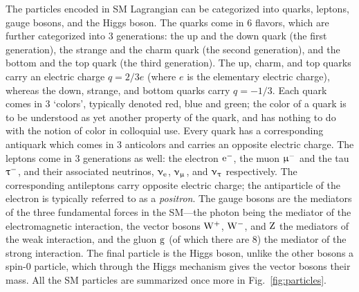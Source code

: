 The particles encoded in SM Lagrangian can be categorized into quarks, leptons, gauge bosons, and the Higgs boson.
% 
The quarks come in 6 flavors, which are further categorized into 3 generations: the up and the down quark (the first generation), the strange and the charm quark (the second generation), and the bottom and the top quark (the third generation).
% 
The up, charm, and top quarks carry an electric charge $q = 2/3e$ (where $e$ is the elementary electric charge), whereas the down, strange, and bottom quarks carry $q=-1/3$.
% 
Each quark comes in 3 `colors', typically denoted red, blue and green; the color of a quark is to be understood as yet another property of the quark, and has nothing to do with the notion of color in colloquial use.
% 
Every quark has a corresponding antiquark which comes in 3 anticolors and carries an opposite electric charge.
% 
The leptons come in 3 generations as well: the electron $\mathrm{e}^-$, the muon $\upmu^-$ and the tau $\uptau^-$, and their associated neutrinos, $\upnu_\mathrm{e}$, $\upnu_\upmu$, and $\upnu_\uptau$ respectively.
% 
The corresponding antileptons carry opposite electric charge; the antiparticle of the electron is typically referred to as a \textit{positron}.
% 
The gauge bosons are the mediators of the three fundamental forces in the SM---the photon being the mediator of the electromagnetic interaction, the vector bosons $\mathrm{W}^+$, $\mathrm{W}^-$, and $\mathrm{Z}$ the mediators of the weak interaction, and the gluon $\mathrm{g}$ (of which there are 8) the mediator of the strong interaction.
% 
The final particle is the Higgs boson, unlike the other bosons a spin-0 particle, which through the Higgs mechanism gives the vector bosons their mass.
% 
All the SM particles are summarized once more in Fig.~\ref{fig:particles}.


